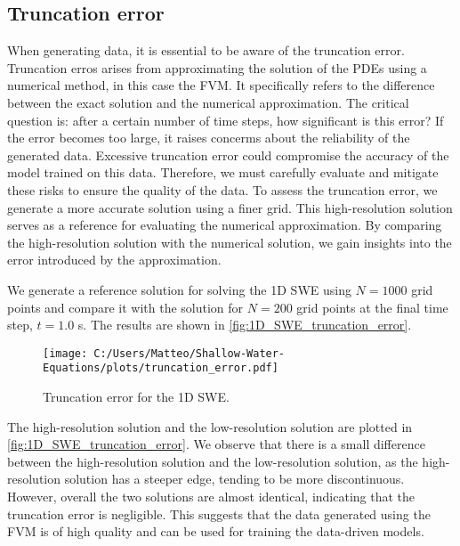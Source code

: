\subsection*{Truncation error}
When generating data, it is essential to be aware of the truncation error.
Truncation erros arises from approximating the solution of the PDEs using a numerical method, in this case the FVM.
It specifically refers to the difference between the exact solution and the numerical approximation.
The critical question is: after a certain number of time steps, how significant is this error?
If the error becomes too large, it raises concerms about the reliability of the generated data.
Excessive truncation error could compromise the accuracy of the model trained on this data.
Therefore, we must carefully evaluate and mitigate these risks to ensure the quality of the data.
To assess the truncation error, we generate a more accurate solution using a finer grid.
This high-resolution solution serves as a reference for evaluating the numerical approximation.
By comparing the high-resolution solution with the numerical solution, we gain insights into the error introduced by the approximation.

We generate a reference solution for solving the 1D SWE using $N = 1000$ grid points and compare it with the solution for $N = 200$ grid points at the final time step, $t = 1.0$ s.
The results are shown in \autoref{fig:1D_SWE_truncation_error}.
\begin{figure}[H]
    \centering
    \texttt{[image: C:/Users/Matteo/Shallow-Water-Equations/plots/truncation\_error.pdf]}
    \caption{Truncation error for the 1D SWE.}\label{fig:1D_SWE_truncation_error}
\end{figure}
The high-resolution solution and the low-resolution solution are plotted in \autoref{fig:1D_SWE_truncation_error}.
We observe that there is a small difference between the high-resolution solution and the low-resolution solution, as the high-resolution solution has a steeper edge, tending to be more discontinuous.
However, overall the two solutions are almost identical, indicating that the truncation error is negligible.
This suggests that the data generated using the FVM is of high quality and can be used for training the data-driven models.

